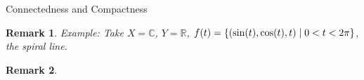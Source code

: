 \documentclass{report}
\newtheorem*{remark}{Remark}
\theoremstyle{definition}
\newcommand{\set}[1]{\ensuremath\left\{#1\right\}}
\newcommand{\RR}{\mathbb{R}}
\newcommand{\CC}{\mathbb{C}}
\begin{document}
\begin{chapter}{Connectedness and Compactness}
\begin{remark}
    Example: Take $X=\CC$, $Y=\RR$,
    $f(t)=\set{(\sin(t), \cos(t), t) \mid 0 < t < 2\pi}$, the spiral
    line.
  \end{remark}

  \begin{remark}

  \end{remark}
\end{chapter}


\printindex
\end{document}
